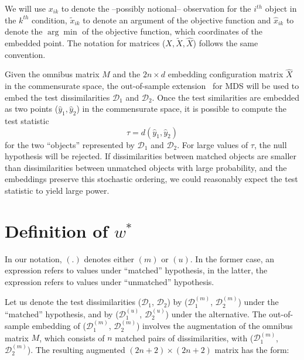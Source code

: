 \documentclass[12pt,oneside,final]{thesis}\usepackage[]{graphicx}\usepackage[]{color}
\begin{document}
\begin{remark} 
We will use $x_{ik}$ to denote the --possibly notional--  observation  for the $i^{th}$ object in the $k^{th}$ condition, $\tilde{x}_{ik}$ to denote an argument of the objective function  and  $\hat{x}_{ik}$  to denote the $\arg\min$  of the objective function, which coordinates of the embedded point. The notation for matrices ($X,\tilde{X},\hat{X}$) follows the  same convention.
\end{remark}

  Given the omnibus matrix $M$ and the $2n \times d$ embedding configuration matrix $\hat{X}$ in the commensurate space, the out-of-sample extension~\cite{TrossetOOS} for MDS will be used to embed the test dissimilarities $\mathcal{D}_1$ and $\mathcal{D}_2$.  Once the test similarities are embedded as two points ($\hat{y}_{1},\hat{y}_{2}$) in  the commensurate space, it is possible to  compute the test statistic \[
\tau=d\left(\hat{y}_{1},\hat{y}_{2}\right)\label{teststat}
\] for the two ``objects'' represented by  $\mathcal{D}_1$ and $\mathcal{D}_2$.  For large values of $\tau$, the null hypothesis will be rejected. 
   If  dissimilarities between matched objects are smaller than dissimilarities between unmatched objects with large probability, and the embeddings preserve this stochastic ordering,  we could reasonably expect the test statistic to yield large  power. 
   
   

\section{Definition of  $w^{*}$}

\begin{remark}
In our notation, $(.)$  denotes  either $(m)$  or   $(u)$. In the former case, an expression refers to values under  ``matched'' hypothesis, in the latter, the expression refers to values under  ``unmatched''   hypothesis.
\end{remark}
Let us denote the test dissimilarities ($\mathcal{D}_1$, $\mathcal{D}_2$)  by  ($\mathcal{D}_1^{(m)}$, $\mathcal{D}_2^{(m)}$)  under the  ``matched'' hypothesis, and  by ($\mathcal{D}_1^{(u)}$, $\mathcal{D}_2^{(u)}$)  under the alternative. The out-of-sample embedding of ($\mathcal{D}_1^{(m)}$, $\mathcal{D}_2^{(m)}$) involves the  augmentation of  the omnibus matrix $M$, which consists of $n$ matched  pairs of dissimilarities,  with ($\mathcal{D}_1^{(m)}$, $\mathcal{D}_2^{(m)}$). The resulting augmented  $(2n+2)\times (2n+2)$ matrix  has the form:
\end{document}
